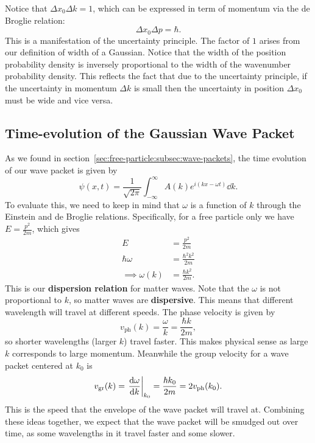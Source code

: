 \documentclass[../quantum_mechanics.tex]{subfiles}
\begin{document}
            Notice that $\Delta x_0\Delta k=1$, which can be expressed in term of momentum via the de Broglie relation:
            \begin{equation}
                \Delta x_0\Delta p=\hbar.
            \end{equation}
            This is a manifestation of the uncertainty principle.
            The factor of $1$ arises from our definition of width of a Gaussian.
            Notice that the width of the position probability density is inversely proportional to the width of the wavenumber probability density.
            This reflects the fact that due to the uncertainty principle, if the uncertainty in momentum $\Delta k$ is small then the uncertainty in position $\Delta x_0$ must be wide and vice versa.

        \subsection{Time-evolution of the Gaussian Wave Packet}\label{subsec:time-evolution-of-the-gaussian-wave-packet}
            As we found in section~\ref{sec:free-particle:subsec:wave-packets}, the time evolution of our wave packet is given by
            \begin{equation}
                \psi(x,t)=\frac{1}{\sqrt{2\pi}}\int_{-\infty}^\infty A(k)e^{i(kx-\omega t)}\dd{k}.
            \end{equation}
            To evaluate this, we need to keep in mind that $\omega$ is a function of $k$ through the Einstein and de Broglie relations.
            Specifically, for a free particle only we have $E=\frac{p^2}{2m}$, which gives
            \begin{align}
                E&=\frac{p^2}{2m}\\
                \hbar\omega&=\frac{\hbar^2k^2}{2m}\\
                \implies\omega(k)&=\frac{\hbar k^2}{2m}.\label{eq:gaussian-dispersion}
            \end{align}
            This is our \textbf{dispersion relation} for matter waves.
            Note that the $\omega$ is not proportional to $k$, so matter waves are \textbf{dispersive}.
            This means that different wavelength will travel at different speeds.
            The phase velocity is given by
            \begin{equation}
                v_\text{ph}(k)=\frac{\omega}{k}=\frac{\hbar k}{2m},
            \end{equation}
            so shorter wavelengths (larger $k$) travel faster.
            This makes physical sense as large $k$ corresponds to large momentum.
            Meanwhile the group velocity for a wave packet centered at $k_0$ is
            \begin{equation}
                v_\text{gr}(k)=\left.\dv{\omega}{k}\right|_{k_0}=\frac{\hbar k_0}{2m}=2v_\text{ph}(k_0).
            \end{equation}
            This is the speed that the envelope of the wave packet will travel at.
            Combining these ideas together, we expect that the wave packet will be smudged out over time, as some wavelengths in it travel faster and some slower.
\end{document}
